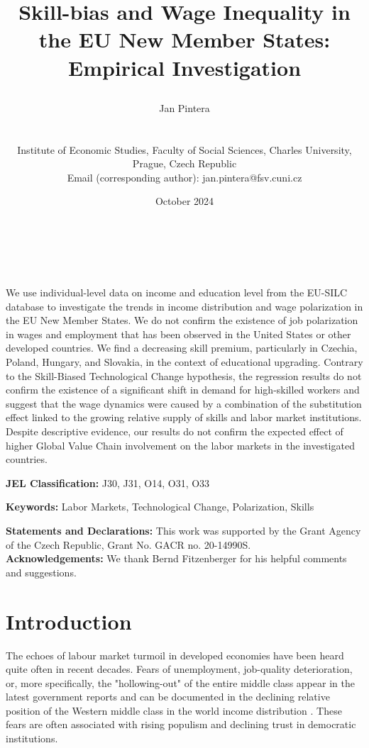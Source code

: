 \documentclass[11pt]{article}
\title{\begin{LARGE}Skill-bias and Wage Inequality in the EU New Member States: Empirical Investigation\end{LARGE}}
\author{    
    \begin{large}Jan Pintera\end{large} \\\vspace{5mm} \begin{small} Institute of Economic Studies, Faculty of Social Sciences, Charles University,\\ Prague, Czech Republic\\
    Email (corresponding author): jan.pintera@fsv.cuni.cz \end{small}
}
\date{October 2024}
\makeatletter
\renewcommand{\maketitle}{\bgroup\setlength{\parindent}{0pt}
\begin{flushright}
  \textbf{\@title}\\
  \vspace{5mm}
  \@author\\
  \vspace{5mm}
  \@date
\end{flushright}\egroup
}
\renewenvironment{abstract}
 {\small
  \begin{flushleft}
  \bfseries \abstractname\vspace{-.5em}\vspace{0pt}
  \end{flushleft}
  \list{}{%
    \setlength{\leftmargin}{0mm}%
    \setlength{\rightmargin}{\leftmargin}%
  }%
  \item\relax}
 {\endlist}
\def \jel {	J30, J31, O14, O31, O33}
\def \Keywords {Labor Markets, Technological Change, Polarization, Skills}
\makeatother
\begin{document}
\maketitle

\thispagestyle{empty}
\begin{abstract}
We use individual-level data on income and education level from the EU-SILC database to investigate the trends in income distribution and wage polarization in the EU New Member States. We do not confirm the existence of job polarization in wages and employment that has been observed in the United States or other developed countries. We find a decreasing skill premium, particularly in Czechia, Poland, Hungary, and Slovakia, in the context of educational upgrading. Contrary to the Skill-Biased Technological Change hypothesis, the regression results do not confirm the existence of a significant shift in demand for high-skilled workers and suggest that the wage dynamics were caused by a combination of the substitution effect linked to the growing relative supply of skills and labor market institutions. Despite descriptive evidence, our results do not confirm the expected effect of higher Global Value Chain involvement on the labor markets in the investigated countries.
\bigskip

\textbf{JEL Classification:} \jel

\textbf{Keywords:}  \Keywords

\bigskip
\textbf{Statements and Declarations:}
This work was supported by the Grant Agency of the Czech Republic, Grant No. GACR no. 20-14990S.
\\

\textbf{Acknowledgements:}
We thank Bernd Fitzenberger for his helpful comments and suggestions.

\end{abstract}
\clearpage
\setcounter{page}{1}



\section{Introduction}
The echoes of labour market turmoil in developed economies have been heard quite often in recent decades. Fears of unemployment, job-quality deterioration, or, more specifically, the "hollowing-out" of the entire middle class appear in the latest government reports \citetext{e.g., \citealt{rodrik2020economic}} and can be documented in the declining relative position of the Western middle class in the world income distribution \citep{milanovic2020elephant}. These fears are often associated with rising populism and declining trust in democratic institutions.
\end{document}
